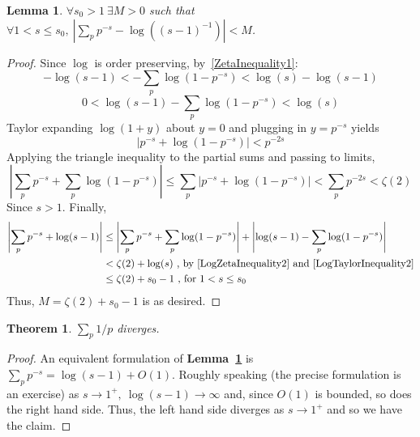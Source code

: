 \documentclass[12pt]{article}
\newcommand{\lref}[1]{\textbf{Lemma~\ref{#1}}}
\newtheorem{thm}{Theorem}
\newtheorem{lemma}{Lemma}
\numberwithin{equation}{section}
\numberwithin{thm}{section}
\numberwithin{lemma}{section}
\numberwithin{cor}{section}
\begin{document}
\begin{lemma}\label{SumOfPrimesEstimate}
  $\forall s_0 > 1 \ \exists M > 0$ such that $\forall 1 < s \leq s_0 , \ \left| \sum_p p^{-s} - \log((s - 1)^{-1}) \right| < M$.
\end{lemma}
\begin{proof}
  Since $\log$ is order preserving, by~\eqref{ZetaInequality1}: \begin{equation}\label{LogZetaInequality1}
    -\log(s - 1) < -\sum_p \log(1 - p^{-s}) < \log(s) - \log(s - 1)
  \end{equation} \begin{equation}\label{LogZetaInequality2}
    0 < \log(s - 1) - \sum_p \log (1 - p^{-s}) < \log(s)
  \end{equation} Taylor expanding $\log (1 + y)$ about $y = 0$ and plugging in $y = p^{-s}$ yields \begin{equation}\label{LogTaylorInequality1}
    \left| p^{-s} + \log(1 - p^{-s}) \right| < p^{-2s}
  \end{equation} Applying the triangle inequality to the partial sums and passing to limits, \begin{equation}\label{LogTaylorInequality2}
    \left| \sum_p p^{-s} + \sum_p \log (1 - p^{-s}) \right| \leq \sum_p |p^{-s} + \log(1 - p^{-s})| < \sum_p p^{-2s} < \zeta(2)
  \end{equation} Since $s > 1$. Finally, \begin{align*}
    \left| \sum_p p^{-s} + \log (s - 1) \right| &\leq \left| \sum_p p^{-s} + \sum_p \log(1 - p^{-s}) \right| + \left| \log(s - 1) - \sum_p \log(1 - p^{-s}) \right| \\
    &< \zeta(2) + \log(s) \text{ , by } \eqref{LogZetaInequality2} \text{ and } \eqref{LogTaylorInequality2} \\
    &\leq \zeta(2) + s_0 - 1 \text{ , for } 1 < s \leq s_0
  \end{align*} Thus, $M = \zeta(2) + s_0 - 1$ is as desired.
\end{proof}

\begin{thm}\label{SumOfPrimesTheorem}
  $\sum_p 1/p$ diverges.
\end{thm}
\begin{proof}
  An equivalent formulation of \lref{SumOfPrimesEstimate} is $\sum_p p^{-s} = \log(s - 1) + O(1)$. Roughly speaking (the precise formulation is an exercise) as $s \to 1^+, \ \log(s - 1) \to \infty$ and, since $O(1)$ is bounded, so does the right hand side. Thus, the left hand side diverges as $s \to 1^+$ and so we have the claim.
\end{proof}
\end{document}

